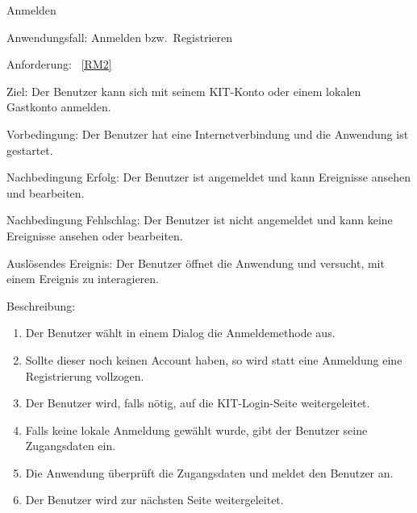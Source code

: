\pagebreak

\begin{function}{20}{Anmelden}
    \item[Anwendungsfall:] Anmelden bzw.\ Registrieren
    \item[Anforderung:]~\ref{RM2}
    \item[Ziel:] Der Benutzer kann sich mit seinem KIT-Konto oder einem lokalen Gastkonto anmelden.
    \item[Vorbedingung:] Der Benutzer hat eine Internetverbindung und die Anwendung ist gestartet.
    \item[Nachbedingung Erfolg:] Der Benutzer ist angemeldet und kann Ereignisse ansehen und bearbeiten.
    \item[Nachbedingung Fehlschlag:] Der Benutzer ist nicht angemeldet und kann keine Ereignisse ansehen oder bearbeiten.
    \item[Auslösendes Ereignis:] Der Benutzer öffnet die Anwendung und versucht, mit einem Ereignis zu interagieren.
    \item[Beschreibung:] ~
    \begin{enumerate}
        \item Der Benutzer wählt in einem Dialog die Anmeldemethode aus.
        \item Sollte dieser noch keinen Account haben, so wird statt eine Anmeldung eine Registrierung vollzogen.
        \item Der Benutzer wird, falls nötig, auf die KIT-Login-Seite weitergeleitet.
        \item Falls keine lokale Anmeldung gewählt wurde, gibt der Benutzer seine Zugangsdaten ein.
        \item Die Anwendung überprüft die Zugangsdaten und meldet den Benutzer an.
        \item Der Benutzer wird zur nächsten Seite weitergeleitet.
    \end{enumerate}
\end{function}

\pagebreak

